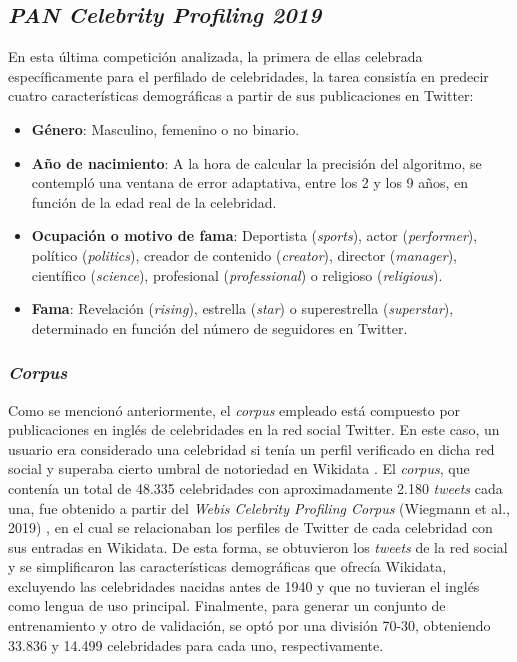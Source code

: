 \subsection{\textit{PAN Celebrity Profiling 2019}}

En esta última competición analizada, la primera de ellas celebrada específicamente para el perfilado de celebridades, la tarea consistía en predecir
cuatro características demográficas a partir de sus publicaciones en Twitter:

\begin{itemize}
	\item \textbf{Género}: Masculino, femenino o no binario.
	\item \textbf{Año de nacimiento}: A la hora de calcular la precisión del algoritmo,
	      se contempló una ventana de error adaptativa, entre los 2 y los 9 años, en función de la edad real de la celebridad.
	\item \textbf{Ocupación o motivo de fama}: Deportista (\textit{sports}), actor (\textit{performer}), político (\textit{politics}), creador de contenido (\textit{creator}),
	      director (\textit{manager}), científico (\textit{science}), profesional (\textit{professional}) o religioso (\textit{religious}).
	\item \textbf{Fama}: Revelación (\textit{rising}), estrella (\textit{star}) o superestrella (\textit{superstar}), determinado en función del número de seguidores en Twitter.
\end{itemize}

\subsubsection{\textit{Corpus}}

Como se mencionó anteriormente, el \textit{corpus} empleado está compuesto por publicaciones en inglés de celebridades en la red social Twitter.
En este caso, un usuario era considerado una celebridad si tenía un perfil verificado en dicha red social y superaba cierto umbral
de notoriedad en Wikidata \cite{wikidata}. El \textit{corpus},
que contenía un total de 48.335 celebridades con aproximadamente 2.180 \textit{tweets} cada una, fue obtenido
a partir del \textit{Webis Celebrity Profiling Corpus} (Wiegmann et al., 2019) \cite{wiegmann2019celebrity}, en el cual se relacionaban los perfiles
de Twitter de cada celebridad con sus entradas en Wikidata. De esta forma, se obtuvieron los \textit{tweets} de la red social
y se simplificaron las características demográficas que ofrecía Wikidata, excluyendo las celebridades nacidas antes de 1940 y que no tuvieran
el inglés como lengua de uso principal. Finalmente, para generar un conjunto de entrenamiento y otro de validación, se optó por una división
70-30, obteniendo 33.836 y 14.499 celebridades para cada uno, respectivamente.

